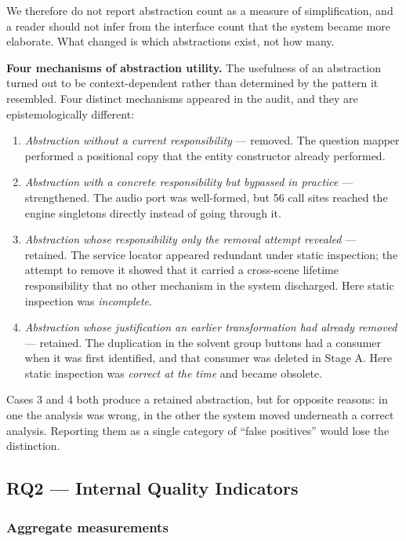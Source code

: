 \documentclass{sbc2019}%
\begin{document}
We therefore do not report abstraction count as a measure of simplification, and
a reader should not infer from the interface count that the system became more
elaborate. What changed is which abstractions exist, not how many.

\medskip\noindent\textbf{Four mechanisms of abstraction utility.} The
usefulness of an abstraction turned out to be context-dependent rather than
determined by the pattern it resembled. Four distinct mechanisms appeared in the
audit, and they are epistemologically different:

\begin{enumerate}\itemsep2pt
\item \emph{Abstraction without a current responsibility} --- removed. The question
mapper performed a positional copy that the entity constructor already performed.
\item \emph{Abstraction with a concrete responsibility but bypassed in practice} ---
strengthened. The audio port was well-formed, but 56 call sites reached the engine
singletons directly instead of going through it.
\item \emph{Abstraction whose responsibility only the removal attempt revealed} ---
retained. The service locator appeared redundant under static inspection; the
attempt to remove it showed that it carried a cross-scene lifetime responsibility
that no other mechanism in the system discharged. Here static inspection was
\emph{incomplete}.
\item \emph{Abstraction whose justification an earlier transformation had already
removed} --- retained. The duplication in the solvent group buttons had a consumer
when it was first identified, and that consumer was deleted in Stage A. Here
static inspection was \emph{correct at the time} and became obsolete.
\end{enumerate}

Cases 3 and 4 both produce a retained abstraction, but for opposite reasons: in
one the analysis was wrong, in the other the system moved underneath a correct
analysis. Reporting them as a single category of ``false positives'' would lose
the distinction.

\subsection{RQ2 --- Internal Quality Indicators}\label{sec:rq2}

\subsubsection{Aggregate measurements}
\end{document}
